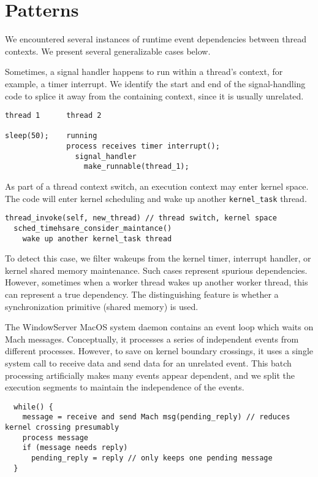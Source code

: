 \section{Patterns}

We encountered several instances of runtime event dependencies between thread
contexts. We present several generalizable cases below.

Sometimes, a signal handler happens to run within a thread's context, for
example, a timer interrupt. We identify the start and end of the
signal-handling code to splice it away from the containing context, since it is
usually unrelated.

{\footnotesize \begin{verbatim}
thread 1      thread 2

sleep(50);    running
              process receives timer interrupt();
                signal_handler
                  make_runnable(thread_1);
\end{verbatim}
}

As part of a thread context switch, an execution context may enter kernel
space. The code will enter kernel scheduling and wake up another
\texttt{kernel\_task} thread.

{\footnotesize \begin{verbatim}
thread_invoke(self, new_thread) // thread switch, kernel space
  sched_timehsare_consider_maintance()
    wake up another kernel_task thread
\end{verbatim}
}

To detect this case, we filter wakeups from the kernel timer, interrupt
handler, or kernel shared memory maintenance. Such cases represent spurious
dependencies. However, sometimes when a worker thread wakes up another worker
thread, this can represent a true dependency. The distinguishing feature is
whether a synchronization primitive (shared memory) is used.

The WindowServer MacOS system daemon contains an event loop which waits on Mach
messages. Conceptually, it processes a series of independent events from
different processes. However, to save on kernel boundary crossings, it uses a
single system call to receive data and send data for an unrelated event. This
batch processing artificially makes many events appear dependent, and we split
the execution segments to maintain the independence of the events.

{\footnotesize \begin{verbatim}
  while() {
    message = receive and send Mach msg(pending_reply) // reduces
kernel crossing presumably
    process message
    if (message needs reply)
      pending_reply = reply // only keeps one pending message
  }
\end{verbatim}
}

